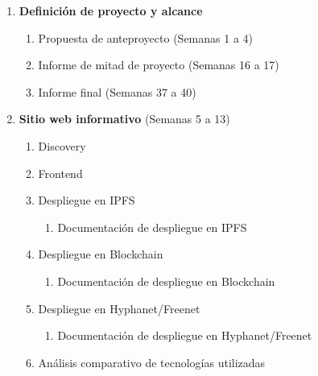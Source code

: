 \begin{enumerate}

    \item \textbf{Definición de proyecto y alcance}
    \begin{enumerate}[label*=\arabic*.]
        \item Propuesta de anteproyecto (Semanas 1 a 4)
        \item Informe de mitad de proyecto (Semanas 16 a 17)
        \item Informe final (Semanas 37 a 40)
    \end{enumerate}
    
    \item \textbf{Sitio web informativo} (Semanas 5 a 13)
    \begin{enumerate}[label*=\arabic*.]
        \item Discovery
        \item Frontend
        \item Despliegue en IPFS
        \begin{enumerate}[label*=\arabic*.]
            \item Documentación de despliegue en IPFS
        \end{enumerate}
        \item Despliegue en Blockchain
        \begin{enumerate}[label*=\arabic*.]
            \item Documentación de despliegue en Blockchain
        \end{enumerate}
        \item Despliegue en Hyphanet/Freenet
        \begin{enumerate}[label*=\arabic*.]
            \item Documentación de despliegue en Hyphanet/Freenet
        \end{enumerate}
        \item Análisis comparativo de tecnologías utilizadas
    \end{enumerate}
    

\end{enumerate}
